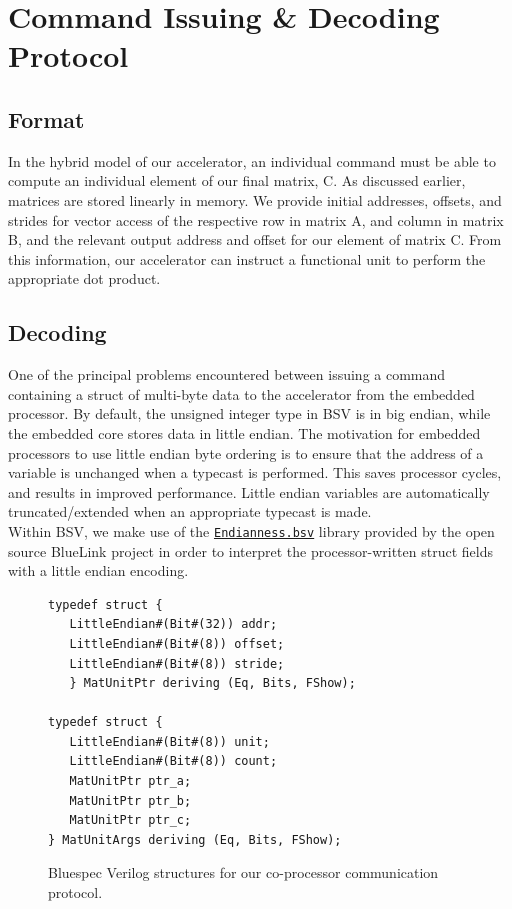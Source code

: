 \documentclass[a4paper,8pt]{report}
\begin{document}
\section{Command Issuing \& Decoding Protocol}
\subsection{Format}
In the hybrid model of our accelerator, an individual command must be able to
compute an individual element of our final matrix, C. As discussed earlier,
matrices are stored linearly in memory. We provide initial addresses, offsets,
and strides for vector access of the respective row in matrix A, and column in
matrix B, and the relevant output address and offset for our element of matrix
C. From this information, our accelerator can instruct a functional unit to
perform the appropriate dot product.

\subsection{Decoding}
One of the principal problems encountered between issuing a command containing
a struct of multi-byte data to the accelerator from the embedded processor. By
default, the unsigned integer type in BSV is in big endian, while the
embedded core stores data in little endian. The motivation for embedded
processors to use little endian byte ordering is to ensure that the address of a
variable is unchanged when a typecast is performed. This saves processor cycles,
and results in improved performance. Little endian variables are automatically
truncated/extended when an appropriate typecast is made. \\


Within BSV, we make use of the \href{https://github.com/jeffreycassidy/BlueLink/blob/master/Core/Endianness.bsv}{\texttt{Endianness.bsv}} library provided by the
open source BlueLink\cite{bluelink} project in order to interpret the processor-written struct
fields with a little endian encoding.

\begin{figure}[h]
\centering 
\scriptsize
\begin{BVerbatim}
typedef struct {
   LittleEndian#(Bit#(32)) addr;
   LittleEndian#(Bit#(8)) offset;
   LittleEndian#(Bit#(8)) stride;
   } MatUnitPtr deriving (Eq, Bits, FShow);

typedef struct {
   LittleEndian#(Bit#(8)) unit;
   LittleEndian#(Bit#(8)) count;
   MatUnitPtr ptr_a;
   MatUnitPtr ptr_b;
   MatUnitPtr ptr_c;
} MatUnitArgs deriving (Eq, Bits, FShow);

\end{BVerbatim}
\normalsize
\caption{Bluespec Verilog structures for our co-processor communication
  protocol. }
\end{figure}
\end{document}
